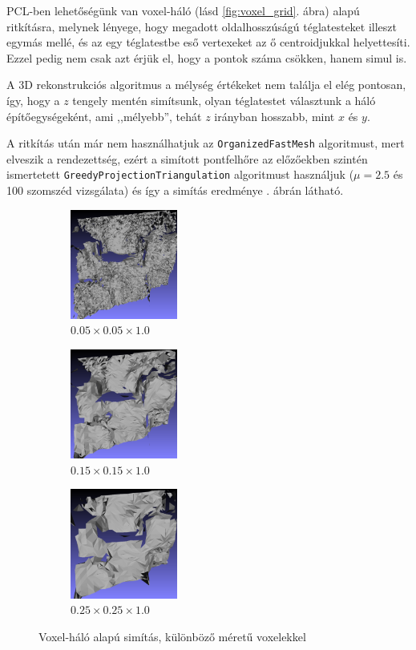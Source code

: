 \documentclass[a4paper,oneside]{article}
\begin{document}
PCL-ben lehetőségünk van voxel-háló (lásd \ref{fig:voxel_grid}. ábra) alapú ritkításra, melynek lényege, hogy megadott oldalhosszúságú téglatesteket illeszt egymás mellé, és az egy téglatestbe eső vertexeket az ő centroidjukkal helyettesíti. Ezzel pedig nem csak azt érjük el, hogy a pontok száma csökken, hanem simul is.

A 3D rekonstrukciós algoritmus a mélység értékeket nem találja el elég pontosan, így, hogy a $z$ tengely mentén simítsunk, olyan téglatestet választunk a háló építőegységeként, ami ,,mélyebb'', tehát $z$ irányban hosszabb, mint $x$ és $y$.

A ritkítás után már nem használhatjuk az \texttt{OrganizedFastMesh} algoritmust, mert elveszik a rendezettség, ezért a simított pontfelhőre az előzőekben szintén ismertetett \texttt{GreedyProjectionTriangulation} algoritmust használjuk ($\mu=2.5$ és 100 szomszéd vizsgálata) és így a simítás eredménye . ábrán látható.

\begin{figure}[tbh]
  \centering
  \begin{subfigure}[b]{.32\linewidth}
	\centering
	\includegraphics[width=100pt]{figs/voxel1.png}
	\caption{$0.05\times 0.05\times 1.0$\label{fig:voxel1}}
  \end{subfigure}%
  \begin{subfigure}[b]{.32\linewidth}
	\centering
	\includegraphics[width=100pt]{figs/voxel3.png}
	\caption{$0.15\times 0.15\times 1.0$\label{fig:voxel3}}
  \end{subfigure}%
  \begin{subfigure}[b]{.32\linewidth}
	\centering
	\includegraphics[width=100pt]{figs/voxel5.png}
	\caption{$0.25\times 0.25\times 1.0$\label{fig:voxel5}}
  \end{subfigure}%
\caption{Voxel-háló alapú simítás, különböző méretű voxelekkel \label{fig:voxelgrid}}
\end{figure}
\end{document}
